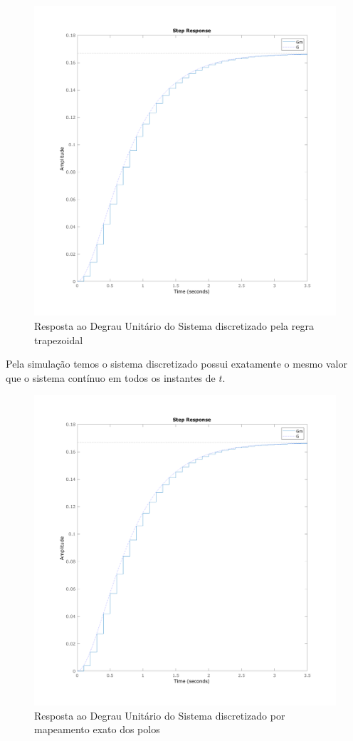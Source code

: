 \documentclass[a4paper,11pt]{article}
\begin{document}
\begin{figure}[H]
    \centering
    \includegraphics[width=0.8\linewidth]{img/exsim2-plot-g-matched.png}
    \caption{Resposta ao Degrau Unitário do Sistema discretizado pela regra trapezoidal}
\end{figure}

Pela simulação temos o sistema discretizado possui exatamente o mesmo valor que o sistema contínuo em todos os instantes de $t$.


\begin{figure}[H]
    \centering
    \includegraphics[width=0.8\linewidth]{img/exsim2-plot-g-matched.png}
    \caption{Resposta ao Degrau Unitário do Sistema discretizado por mapeamento exato dos polos}
\end{figure}
\end{document}
